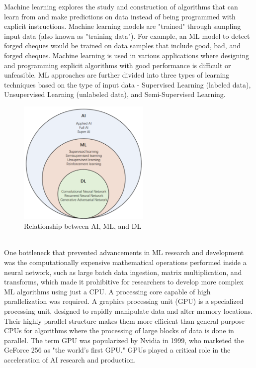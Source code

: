 Machine learning explores the study and construction of algorithms that can learn from and make
predictions on data instead of being programmed with explicit instructions. Machine learning models are "trained" through sampling input data (also known as "training data"). For example, an ML model to detect forged cheques would be trained on data samples that include good, bad, and forged cheques. Machine learning is used in various applications where designing and programming explicit algorithms with good performance is difficult or unfeasible. ML approaches are further divided into three types of learning techniques based on the type of input data - Supervised Learning (labeled data), Unsupervised Learning (unlabeled data), and Semi-Supervised Learning.\cite{das2015applications}
\begin{figure}[H]
    \centering
    \includegraphics[width=\textwidth,height=6cm,keepaspectratio=true]{src/Images/ai_ml_dl.png}
    \caption{
      Relationship between AI, ML, and DL\cite{ai_ml_dl_img}
    }
\end{figure}
\\

One bottleneck that prevented advancements in ML research and development was the computationally expensive mathematical operations performed inside a neural network, such as large batch data ingestion, matrix multiplication, and transforms, which made it prohibitive for researchers to develop more complex ML algorithms using just a CPU. A processing core capable of high parallelization was required. A graphics processing unit (GPU) is a specialized processing unit, designed to rapidly manipulate data and alter memory locations. Their highly parallel structure makes them more efficient than general-purpose CPUs for algorithms where the processing of large blocks of data is done in parallel. The term GPU was popularized by Nvidia in 1999, who marketed the GeForce 256 as "the world's first GPU." GPUs played a critical role in the acceleration of AI research and production.\cite{8259629}

